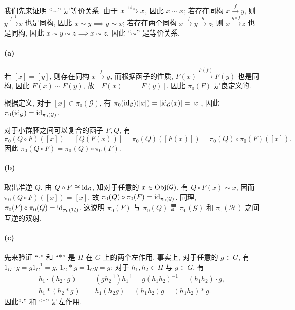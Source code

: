 \documentclass{article}
\begin{document}
\begin{solution}
	我们先来证明 ``$\sim$'' 是等价关系. 由于 $x \xrightarrow{\operatorname{id}_x} x$, 因此 $x \sim x$; 若存在同构 $x \xrightarrow{f} y$, 则 $y \xrightarrow{f^{-1}} x	$ 也是同构, 因此 $x \sim y \implies y \sim x$; 若存在两个同构 $x \xrightarrow{f} y \xrightarrow{g} z$, 则 $x \xrightarrow{g \circ f} z$ 也是同构, 因此 $x \sim y \sim z \implies x \sim z$. 因此 ``$\sim$'' 是等价关系.

	\paragraph{(a)} 若 $[x] = [y]$, 则存在同构 $x \xrightarrow{f} y$, 而根据函子的性质, $F(x) \xrightarrow{F(f)} F(y)$ 也是同构, 因此 $F(x)\sim F(y)$, 故 $[F(x)] = [F(y)]$. 因此 $\pi_0(F)$ 是良定义的.

	根据定义, 对于 $[x] \in \pi_0(\mathcal{G})$, 有 $\pi_0(\operatorname{id}_{\mathcal{G}})([x]) = [\operatorname{id}_{\mathcal{G}}(x)] = [x	]$, 因此 $\pi_0(\operatorname{id}_{\mathcal{G}}) = \operatorname{id}_{\pi_0(\mathcal{G})}$. 

	对于小群胚之间可以复合的函子 $F,Q$, 有
	\[ \pi_0(Q \circ F)([x]) = [Q(F(x))] = \pi_0(Q)([F(x)]) = \pi_0(Q) \circ \pi_0(F) ([x]). \]
	因此 $\pi_0(Q \circ F) = \pi_0(Q) \circ \pi_0(F)$.

	\paragraph{(b)} 取出准逆 $Q$. 由 $Q \circ F \cong \operatorname{id}_{\mathcal{G}}$, 知对于任意的 $x \in \operatorname{Obj}(\mathcal{G})$, 有 $Q \circ F(x) \sim x$, 因而 $\pi_0(Q \circ F)([x]) = [x]$, 故 $\pi_0(Q) \circ \pi_0(F) = \operatorname{id}_{\pi_0(\mathcal{G})}$. 同理, $\pi_0(F) \circ \pi_0(Q) = \operatorname{id}_{\pi_0(\mathcal{H})}$. 这说明 $\pi_0(F)$ 与 $\pi_0(Q)$ 是 $\pi_0(\mathcal{G})$ 和 $\pi_0(\mathcal{H})$ 之间互逆的双射. 

	\paragraph{(c)} 先来验证 ``$\cdot$'' 和 ``$*$'' 是 $H$ 在 $G$ 上的两个左作用. 事实上, 对于任意的 $g\in G$, 有 $1_G \cdot g = g1_G^{-1} = g$, $1_G * g = 1_Gg = g$; 对于 $h_1, h_2 \in H$ 与 $g \in G$, 有
	\begin{align*}
		h_1 \cdot (h_2 \cdot g) &= (gh_2^{-1}) h_1^{-1} = g(h_1h_2)^{-1} = (h_1h_2) \cdot g, \\
		h_1 * (h_2 * g) &= h_1 (h_2 g) = (h_1h_2) g = (h_1h_2) * g.
	\end{align*}
	因此``$\cdot$'' 和 ``$*$'' 是左作用. 


\end{solution}
\end{document}
